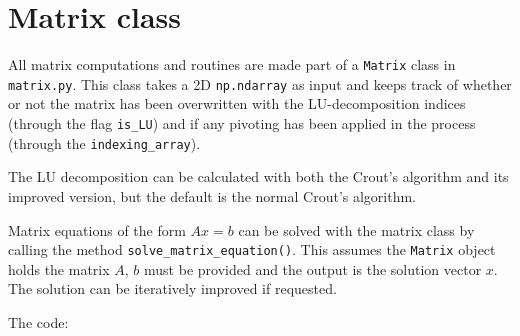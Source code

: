 \section{Matrix class}

All matrix computations and routines are made part of a \texttt{Matrix} class in \texttt{matrix.py}. This class
takes a 2D \texttt{np.ndarray} as input and keeps track of whether or not the matrix has been overwritten with
the LU-decomposition indices (through the flag \texttt{is\_LU}) and if any pivoting has been applied in the process
(through the \texttt{indexing\_array}).

The LU decomposition can be calculated with both the Crout's algorithm and its improved version, but the default is
the normal Crout's algorithm.

Matrix equations of the form $Ax=b$ can be solved with the matrix class by calling the method \texttt{solve\_matrix\_equation()}.
This assumes the \texttt{Matrix} object holds the matrix $A$, $b$ must be provided and the output is the solution vector $x$.
The solution can be iteratively improved if requested.

\noindent The code:
